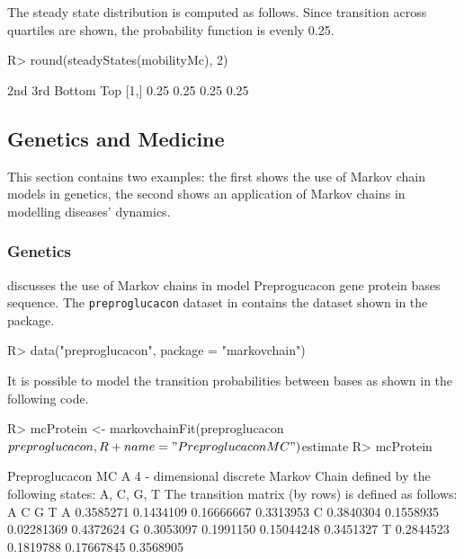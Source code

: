 \documentclass[
  nojss]{jss}
\begin{document}
The steady state distribution is computed as follows. Since transition across quartiles are shown, the probability function is evenly 0.25.

\begin{CodeChunk}

\begin{CodeInput}
R> round(steadyStates(mobilityMc), 2)
\end{CodeInput}

\begin{CodeOutput}
      2nd  3rd Bottom  Top
[1,] 0.25 0.25   0.25 0.25
\end{CodeOutput}
\end{CodeChunk}

\hypertarget{sec:gen}{%
\subsection{Genetics and Medicine}\label{sec:gen}}

This section contains two examples: the first shows the use of Markov chain models in genetics, the second shows an application of Markov chains in modelling diseases' dynamics.

\hypertarget{sec:genetics}{%
\subsubsection{Genetics}\label{sec:genetics}}

\cite{averyHenderson} discusses the use of Markov chains in model Preprogucacon gene protein bases sequence. The \texttt{preproglucacon} dataset in  contains the dataset shown in the package.

\begin{CodeChunk}

\begin{CodeInput}
R> data("preproglucacon", package = "markovchain")
\end{CodeInput}
\end{CodeChunk}

It is possible to model the transition probabilities between bases as shown in the following code.

\begin{CodeChunk}

\begin{CodeInput}
R> mcProtein <- markovchainFit(preproglucacon$preproglucacon, 
R+                           name = "Preproglucacon MC")$estimate
R> mcProtein
\end{CodeInput}

\begin{CodeOutput}
Preproglucacon MC 
 A  4 - dimensional discrete Markov Chain defined by the following states: 
 A, C, G, T 
 The transition matrix  (by rows)  is defined as follows: 
          A         C          G         T
A 0.3585271 0.1434109 0.16666667 0.3313953
C 0.3840304 0.1558935 0.02281369 0.4372624
G 0.3053097 0.1991150 0.15044248 0.3451327
T 0.2844523 0.1819788 0.17667845 0.3568905
\end{CodeOutput}
\end{CodeChunk}
\end{document}
